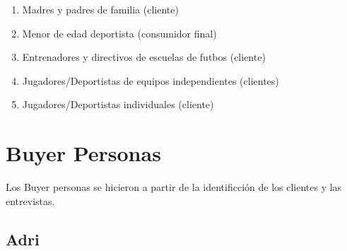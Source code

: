 \documentclass[11pt]{article}
\begin{document}
\begin{enumerate}
\item Madres y padres de familia (cliente)

\item Menor de edad deportista (consumidor final)

\item Entrenadores y directivos de escuelas de futbos (cliente)

\item Jugadores/Deportistas de equipos independientes (clientes)

\item Jugadores/Deportistas individuales (cliente)
\end{enumerate}



\section{Buyer Personas}
\label{sec:org3895450}

Los Buyer personas se hicieron a partir de la identificción de los
clientes y las entrevistas. 

\subsection{Adri}
\label{sec:orgacbdbe4}
\end{document}
